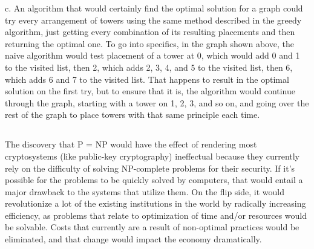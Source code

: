 \documentclass{article}
\begin{document}
\newline
c. An algorithm that would certainly find the optimal solution for a graph could try every arrangement of towers using the same method described in the greedy algorithm, just getting every combination of its resulting placements and then returning the optimal one. To go into specifics, in the graph shown above, the naive algorithm would test placement of a tower at 0, which would add 0 and 1 to the visited list, then 2, which adds 2, 3, 4, and 5 to the visited list, then 6, which adds 6 and 7 to the visited list. That happens to result in the optimal solution on the first try, but to ensure that it is, the algorithm would continue through the graph, starting with a tower on 1, 2, 3, and so on, and going over the rest of the graph to place towers with that same principle each time.

\subsection{}
The discovery that P = NP would have the effect of rendering most cryptosystems (like public-key cryptography) ineffectual because they currently rely on the difficulty of solving NP-complete problems for their security. If it's possible for the problems to be quickly solved by computers, that would entail a major drawback to the systems that utilize them. On the flip side, it would revolutionize a lot of the existing institutions in the world by radically increasing efficiency, as problems that relate to optimization of time and/or resources would be solvable. Costs that currently are a result of non-optimal practices would be eliminated, and that change would impact the economy dramatically.
\end{document}
